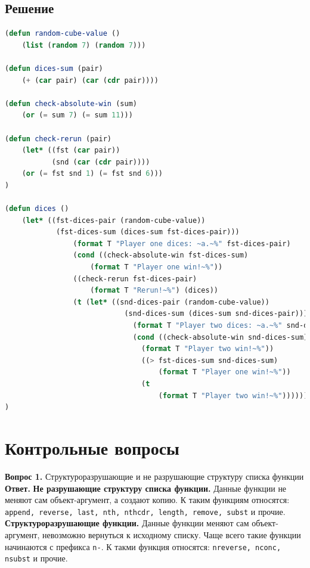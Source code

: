 \documentclass[12pt]{report}
\begin{document}
\subsection*{Решение}
\begin{lstlisting}[label=5,caption=Решение задания №5, language=lisp]
(defun random-cube-value ()
	(list (random 7) (random 7)))

(defun dices-sum (pair)
	(+ (car pair) (car (cdr pair))))

(defun check-absolute-win (sum)
	(or (= sum 7) (= sum 11)))

(defun check-rerun (pair)
	(let* ((fst (car pair))
		   (snd (car (cdr pair))))
	(or (= fst snd 1) (= fst snd 6)))
)

(defun dices ()
	(let* ((fst-dices-pair (random-cube-value))
			(fst-dices-sum (dices-sum fst-dices-pair)))
				(format T "Player one dices: ~a.~%" fst-dices-pair)
				(cond ((check-absolute-win fst-dices-sum)
					(format T "Player one win!~%"))
				((check-rerun fst-dices-pair)
					(format T "Rerun!~%") (dices))
				(t (let* ((snd-dices-pair (random-cube-value))
					   	    (snd-dices-sum (dices-sum snd-dices-pair)))
					          (format T "Player two dices: ~a.~%" snd-dices-pair)
						  	  (cond ((check-absolute-win snd-dices-sum)
						      	(format T "Player two win!~%"))
						  		((> fst-dices-sum snd-dices-sum)
							  		(format T "Player one win!~%"))
						  		(t
							  		(format T "Player two win!~%")))))))
)

\end{lstlisting}


\section*{Контрольные вопросы}
\textbf{Вопрос 1.} Структуроразрушающие и не разрушающие структуру списка функции\newline
\indent\textbf{Ответ.} \textbf{Не разрушающие структуру списка функции.} Данные функции не меняют сам объект-аргумент, а создают копию. К таким функциям относятся: 
\texttt{append, reverse, last, nth, nthcdr, length, remove, subst} и прочие.\\

\indent \textbf{Структуроразрушающие функции.} Данные функции меняют сам объект-аргумент, невозможно вернуться к исходному списку. Чаще всего такие функции начинаются с префикса \texttt{n-}. К такми функция относятся: \texttt{nreverse, nconc, nsubst} и прочие.\\
\end{document}
